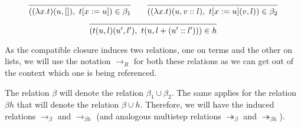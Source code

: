 \begin{definition}  
    \[
    \begin{prooftree}
      \infer0{ ((\lambda x . t)(u, []), \ t[x := u]) \in \beta_1 } 
    \end{prooftree}
    \qquad
    \begin{prooftree}
      \infer0{ ((\lambda x . t)(u, v::l), \ t[x := u](v, l)) \in \beta_2 } 
    \end{prooftree}
  \]
  \[
    \begin{prooftree}
      \infer0{ (t(u, l)(u', l'), \ t(u, l + (u'::l'))) \in h } 
    \end{prooftree}
  \]
\end{definition}

\begin{remark}
  As the compatible closure induces two relations, one on terms and the other on lists, we will use the notation $\to_R$ for both these relations as we can get out of the context which one is being referenced.
\end{remark}

\begin{definition}
  The relation $\beta$ will denote the relation $\beta_1 \cup \beta_2$.
  The same applies for the relation $\beta h$ that will denote the relation $\beta \cup h$.
  Therefore, we will have the induced relations $\to_\beta$ and $\to_{\beta h}$ (and analogous multistep relations $\twoheadrightarrow_\beta$ and $\twoheadrightarrow_{\beta h}$).
\end{definition}


\begin{comment}
\begin{definition}[$\beta h$-normal forms]
  We inductively define the sets of $\LamM$-terms and $\LamM$-lists in $\beta h$-normal form, respectively NF and NL, as follows:
  \[
    \begin{prooftree}
      \infer0{ x \in \text{NF} }
    \end{prooftree}
    \qquad
    \begin{prooftree}
      \hypo{ t \in \text{NF} }
      \infer1{ \lambda x . t \in \text{NF} } 
    \end{prooftree}
    \qquad
    \begin{prooftree}
      \hypo{ u \in \text{NF} } 
      \hypo{ l \in \text{NL} }
      \infer2{ x(u, l) \in \text{NF} }
    \end{prooftree}
    \qquad
    \begin{prooftree}
      \infer0{ [] \in \text{NL} } 
    \end{prooftree}
    \qquad
    \begin{prooftree}
      \hypo{ u \in \text{NF} }
      \hypo{ l \in \text{NL} }
      \infer2{ u::l \in \text{NL} }
    \end{prooftree}
  \]
\end{definition}
\end{comment}

